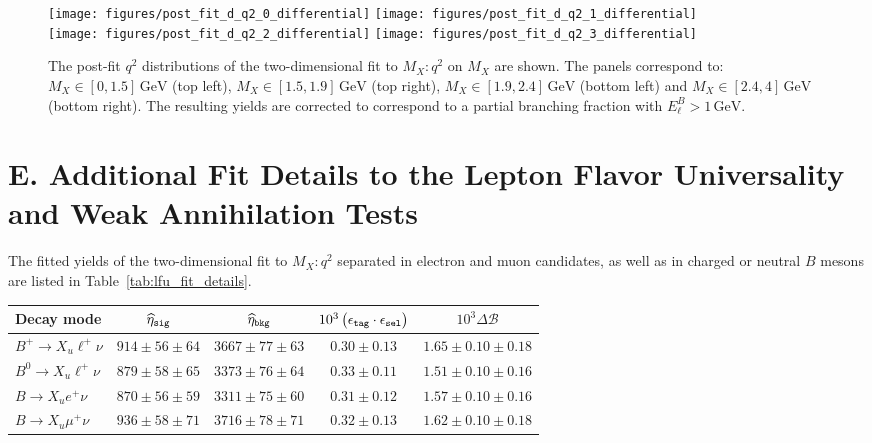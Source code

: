 \documentclass[twocolumn,aps,prd,superscriptaddress,nofootinbib,floatfix,preprintnumbers,a4]{revtex4-1}
\renewcommand{\arraystretch}{1.25}
\begin{document}
\begin{appendix}
\begin{figure}[h!]
  \texttt{[image: figures/post\_fit\_d\_q2\_0\_differential]}
  \texttt{[image: figures/post\_fit\_d\_q2\_1\_differential]} \\
  \texttt{[image: figures/post\_fit\_d\_q2\_2\_differential]} 
  \texttt{[image: figures/post\_fit\_d\_q2\_3\_differential]}
\caption{
 The post-fit $q^2$ distributions of the two-dimensional fit to $M_X:q^2$ on $M_{X}$ are shown. The panels correspond to: $M_X \in [0, 1.5] \,  \mathrm{GeV}$ (top left), $M_X \in [1.5,1.9] \, \mathrm{GeV}$ (top right), $M_X \in [1.9,2.4]  \, \mathrm{GeV}$ (bottom left)  and $M_X \in [2.4,4] \,  \mathrm{GeV}$ (bottom right). The resulting yields are corrected to correspond to a partial branching fraction with $E_\ell^B > 1 \, \text{GeV}$. 
 }
\label{fig:2Dfit_projections}
\end{figure} 

\clearpage

\section*{E. Additional Fit Details to the Lepton Flavor Universality and Weak Annihilation Tests}

The fitted yields of the two-dimensional fit to $M_{X}:q^2$ separated in electron and muon candidates, as well as in charged or neutral $B$ mesons are listed in Table~\ref{tab:lfu_fit_details}.

\begin{table*}[]
\caption{
	The fitted yields separated in electron and muon candidates, as well as in charged or neutral $B$ mesons.
}
\renewcommand\arraystretch{1.0}
\centering
\begin{tabular}{lcccc}
\hline
\hline
Decay mode               & $\widehat{\eta}_{\tt{sig}}$      & $\widehat{\eta}_{\tt{bkg}}$           & $10^{3}\left(\epsilon_{\tt{tag}} \cdot \epsilon_{\tt{sel}}\right)$ & $10^{3}\Delta \mathcal{B}$ \\ \hline
$B^{+} \to X_{u}\ell^{+}\nu$   & $914 \pm 56 \pm 64$        & $3667  \pm 77 \pm 63 $                  & $0.30 \pm 0.13$                                                   & $1.65 \pm 0.10 \pm 0.18 $ \\ 
$B^{0} \to X_{u}\ell^{+}\nu$   & $879 \pm 58 \pm 65$        & $3373  \pm 76 \pm 64 $                  & $0.33 \pm 0.11$                                                   & $1.51 \pm 0.10 \pm 0.16 $ \\ 
\hline
$B \to X_{u} e^{+}\nu$         & $870 \pm 56 \pm 59$        & $3311  \pm 75 \pm 60 $                  & $0.31 \pm 0.12$                                                   & $1.57 \pm 0.10 \pm 0.16 $ \\ 
$B \to X_{u} \mu^{+}\nu$       & $936 \pm 58 \pm 71$        & $3716  \pm 78 \pm 71 $                  & $0.32 \pm 0.13$                                                   & $1.62 \pm 0.10 \pm 0.18 $ \\ 
\hline\hline
\end{tabular}
\label{tab:lfu_fit_details}
\end{table*}


\end{appendix}
\end{document}
